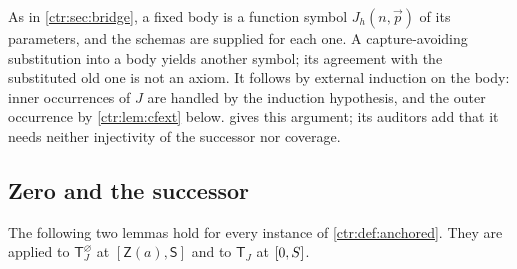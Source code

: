 \begin{remark}\label{ctr:rem:cfdescriptors}
As in \cref{ctr:sec:bridge}, a fixed body is a function symbol $J_h(n,\vec p)$ of its
parameters, and the schemas are supplied for each one. A capture-avoiding substitution
into a body yields another symbol; its agreement with the substituted old one is not an
axiom. It follows by external induction on the body: inner occurrences of $J$ are handled by
the induction hypothesis, and the outer occurrence by \cref{ctr:lem:cfext} below.
 gives this argument; its auditors add that it needs neither injectivity
of the successor nor coverage.
\end{remark}

\subsection{Zero and the successor}

The following two lemmas hold for every instance of \cref{ctr:def:anchored}. They are
applied to $\mathsf T_J^{\varnothing}$ at $[\mathsf Z(a),\mathsf S]$ and to $\mathsf T_J$
at $[0,S]$.


